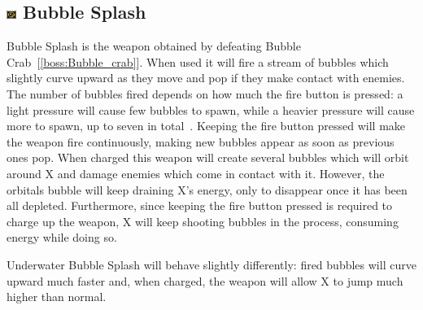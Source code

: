 \subsection{\includegraphics[width=12px, height=10px]{figures/X2/weapons/B_splash.png} Bubble Splash}\label{Bubble_splash}
Bubble Splash is the weapon obtained by defeating Bubble Crab~[\ref{boss:Bubble_crab}]. When used it will fire a stream of bubbles which slightly curve upward as they move and pop if they make contact with enemies.  The number of bubbles fired depends on how much the fire button is pressed: a light pressure will cause few bubbles to spawn, while a heavier pressure will cause more to spawn, up to seven in total~\cite{wiki:Bubble_splash}. Keeping the fire button pressed will make the weapon fire continuously, making new bubbles appear as soon as previous ones pop. When charged this weapon will create several bubbles which will orbit around X and damage enemies which come in contact with it. However, the orbitals bubble will keep draining X's energy, only to disappear once it has been all depleted. Furthermore, since keeping the fire button pressed is required to charge up the weapon, X will keep shooting bubbles in the process, consuming energy while doing so. 

Underwater Bubble Splash will behave slightly differently: fired bubbles will curve upward much faster and, when charged, the weapon will allow X to jump much higher than normal.

